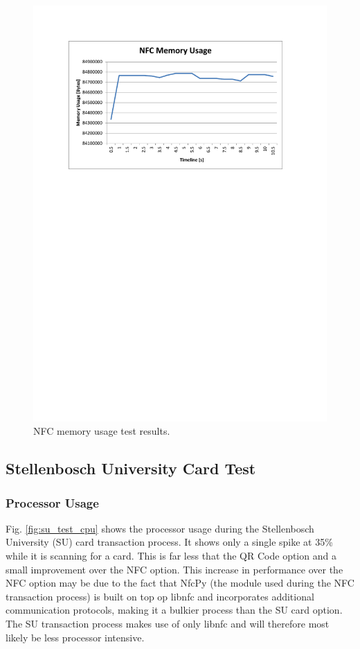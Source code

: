 \begin{figure}
 \centering 
 \includegraphics[clip=true, trim = 0 510 0 70,
 scale=0.7]{nfc_test_mem}
 \caption{NFC memory usage test results.}
 \label{fig:nfc_test_mem}
\end{figure}

\subsection{Stellenbosch University Card Test}

\subsubsection{Processor Usage}

Fig. \ref{fig:su_test_cpu} shows the processor usage during the Stellenbosch University
(SU) card transaction process. It shows only a single spike at 35\% while it is
scanning for a card. This is far less that the QR Code option and a small
improvement over the NFC option. This increase in performance over the NFC
option may be due to the fact that NfcPy (the module used during the NFC
transaction process) is built on top op libnfc and incorporates additional
communication protocols, making it a bulkier process than the SU card option.
The SU transaction process makes use of only libnfc and will therefore most
likely be less processor intensive.

